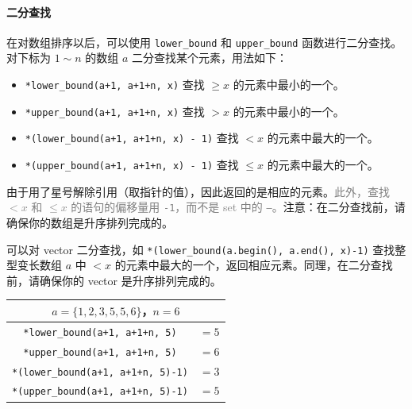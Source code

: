 \documentclass[UTF8]{ctexart}
\newcommand\Emph[1]{\colorbox{green!10}{\textcolor{green!30!black}{#1}}}
\begin{document}
\paragraph{二分查找}
在对数组排序以后，可以使用 \verb!lower_bound! 和 \verb!upper_bound! 函数进行二分查找。对下标为 $1\sim n$ 的数组 $a$ 二分查找某个元素，用法如下：
\begin{itemize}[itemsep=0pt,parsep=0pt]
    \item \verb!*lower_bound(a+1, a+1+n, x)! 查找 $\geqslant x$ 的元素中最小的一个。
    \item \verb!*upper_bound(a+1, a+1+n, x)! 查找 $> x$ 的元素中最小的一个。
    \item \verb!*(lower_bound(a+1, a+1+n, x) - 1)! 查找 $< x$ 的元素中最大的一个。
    \item \verb!*(upper_bound(a+1, a+1+n, x) - 1)! 查找 $\leqslant x$ 的元素中最大的一个。
\end{itemize}
由于用了星号解除引用（取指针的值），因此返回的是相应的元素。\textcolor{gray}{此外，查找 $<x$ 和 $\leqslant x$ 的语句的偏移量用 \texttt{-1}，而不是 set 中的 \texttt{--}。}注意：在二分查找前，请确保你的数组是\Emph{升序排列完成}的。

可以对 vector 二分查找，如 \verb!*(lower_bound(a.begin(), a.end(), x)-1)! 查找整型变长数组 $a$ 中 $<x$ 的元素中最大的一个，返回相应元素。同理，在二分查找前，请确保你的 vector 是\Emph{升序排列完成}的。

\begin{table}[htb]
    \centering
    \begin{tabular}{cc}
    \toprule
        \multicolumn{2}{c}{$a=\{1,2,3,5,5,6\}$，$n=6$} \\
    \midrule
        \verb!*lower_bound(a+1, a+1+n, 5)! & $=5$ \\
        \verb!*upper_bound(a+1, a+1+n, 5)! & $=6$ \\
        \verb!*(lower_bound(a+1, a+1+n, 5)-1)! & $=3$ \\
        \verb!*(upper_bound(a+1, a+1+n, 5)-1)! & $=5$ \\
    \bottomrule
    \end{tabular}
\end{table}


\newpage
\end{document}

